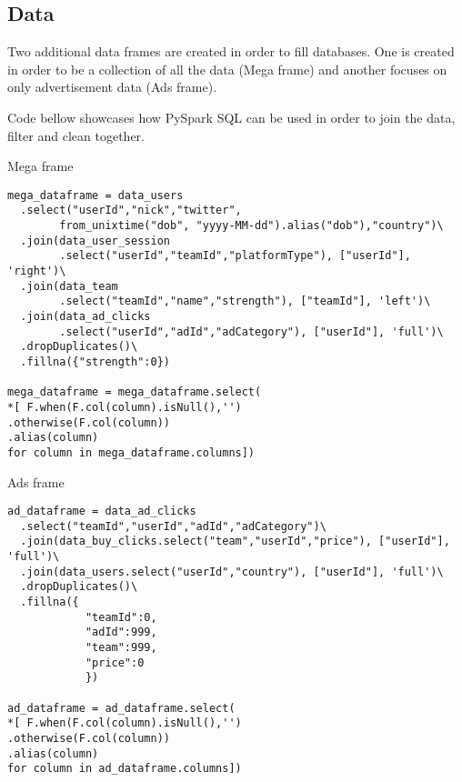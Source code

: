 \subsection{Data}
Two additional data frames are created in order to fill databases. One is created in order to be a collection of all the data (Mega frame) and another focuses on only advertisement data (Ads frame).

Code bellow showcases how PySpark SQL can be used in order to join the data, filter and clean together.

\begin{listing}[H]
\caption{Mega frame}
\begin{verbatim}
mega_dataframe = data_users
  .select("userId","nick","twitter", 
        from_unixtime("dob", "yyyy-MM-dd").alias("dob"),"country")\
  .join(data_user_session
        .select("userId","teamId","platformType"), ["userId"], 'right')\
  .join(data_team
        .select("teamId","name","strength"), ["teamId"], 'left')\
  .join(data_ad_clicks
        .select("userId","adId","adCategory"), ["userId"], 'full')\
  .dropDuplicates()\
  .fillna({"strength":0})
                
mega_dataframe = mega_dataframe.select( 
*[ F.when(F.col(column).isNull(),'')
.otherwise(F.col(column))
.alias(column) 
for column in mega_dataframe.columns])  
\end{verbatim}
\end{listing}

\begin{listing}[H]
\caption{Ads frame}
\begin{verbatim}
ad_dataframe = data_ad_clicks
  .select("teamId","userId","adId","adCategory")\
  .join(data_buy_clicks.select("team","userId","price"), ["userId"], 'full')\
  .join(data_users.select("userId","country"), ["userId"], 'full')\
  .dropDuplicates()\
  .fillna({
            "teamId":0,
            "adId":999,
            "team":999,
            "price":0
            })
                
ad_dataframe = ad_dataframe.select( 
*[ F.when(F.col(column).isNull(),'')
.otherwise(F.col(column))
.alias(column) 
for column in ad_dataframe.columns])                
\end{verbatim}
\end{listing}